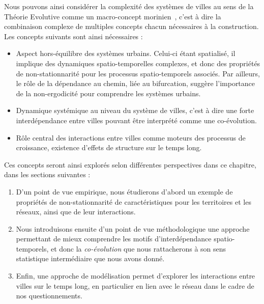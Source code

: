 Nous pouvons ainsi considérer la complexité des systèmes de villes au sens de la Théorie Evolutive comme un macro-concept morinien~\cite{morin1976methode}, c'est à dire la combinaison complexe de multiples concepts chacun nécessaires à la construction. Les concepts suivants sont ainsi nécessaires :
\begin{itemize}
	\item Aspect hors-équilibre des systèmes urbains. Celui-ci étant spatialisé, il implique des dynamiques spatio-temporelles complexes, et donc des propriétés de non-stationnarité pour les processus spatio-temporels associés. Par ailleurs, le rôle de la dépendance au chemin, liée au bifurcation, suggère l'importance de la non-ergodicité pour comprendre les systèmes urbains.
	\item Dynamique systémique au niveau du système de villes, c'est à dire une forte interdépendance entre villes pouvant être interprété comme une co-évolution.
	\item Rôle central des interactions entre villes comme moteurs des processus de croissance, existence d'effets de structure sur le temps long.
\end{itemize}


Ces concepts seront ainsi explorés selon différentes perspectives dans ce chapitre, dans les sections suivantes :
\begin{enumerate}
	\item D'un point de vue empirique, nous étudierons d'abord un exemple de propriétés de non-stationnarité de caractéristiques pour les territoires et les réseaux, ainsi que de leur interactions.
	\item Nous introduisons ensuite d'un point de vue méthodologique une approche permettant de mieux comprendre les motifs d'interdépendance spatio-temporels, et donc la \emph{co-évolution} que nous rattacherons à son sens statistique intermédiaire que nous avons donné.
	\item Enfin, une approche de modélisation permet d'explorer les interactions entre villes sur le temps long, en particulier en lien avec le réseau dans le cadre de nos questionnements.
\end{enumerate}




\stars






